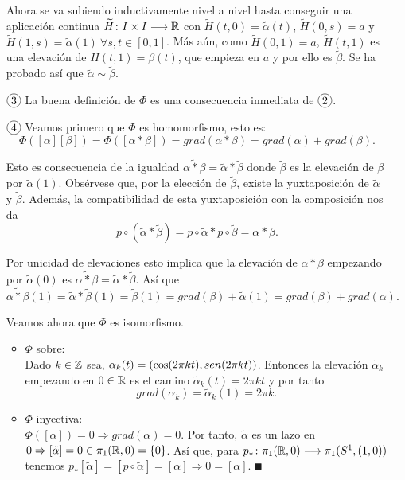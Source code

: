 \documentclass[GTS.tex]{subfiles}
\begin{document}
\begin{dem}
\begin{enumerate}
Ahora se va subiendo inductivamente nivel a nivel hasta conseguir una aplicación continua $\widetilde{H}\colon{I\times I}\longrightarrow{\mathbb{R}}$ con $\widetilde{H}(t,0)=\tilde{\alpha}(t)$, $\widetilde{H}(0,s)=a$ y $\widetilde{H}(1,s)=\tilde{\alpha}(1)\ \forall s,t\in[0,1]$. Más aún, como
$\widetilde{H}(0,1)=a$, $\widetilde{H}(t,1)$ es una elevación de $H(t,1)=\beta(t)$, que empieza en $a$ y por ello es $\tilde{\beta}$. Se ha probado así que $\tilde{\alpha}\sim\tilde{\beta}$.

\item[$\circled{3}$] La buena definición de $\Phi$ es una consecuencia inmediata de $\circled{2}$.

\item[$\circled{4}$] Veamos primero que $\Phi$ es homomorfismo, esto es:
\[
\Phi([\alpha][\beta])=\Phi([\alpha*\beta])=grad(\alpha*\beta)=grad(\alpha)+grad(\beta).
\]

Esto es consecuencia de la igualdad $\widetilde{\alpha*\beta}=\tilde{\alpha}*\tilde{\beta}$ donde $\tilde{\beta}$ es la elevación de $\beta$ por $\tilde{\alpha}(1)$. Obsérvese que, por la elección de $\tilde{\beta}$, existe la yuxtaposición de $\tilde{\alpha}$ y $\tilde{\beta}$. Además, la compatibilidad de esta yuxtaposición con la composición nos da
\[
p\circ(\tilde{\alpha}*\tilde{\beta})=p\circ\tilde{\alpha}*p\circ\tilde{\beta}=\alpha*\beta.
\]

Por unicidad de elevaciones esto implica que la elevación de $\alpha*\beta$ empezando por $\tilde{\alpha}(0)$ es $\widetilde{\alpha*\beta}=\tilde{\alpha}*\tilde{\beta}$. Así que
\[
\widetilde{\alpha*\beta}(1)=\tilde{\alpha}*\tilde{\beta}(1)=\tilde{\beta}(1)=grad(\beta)+\tilde{\alpha}(1)=grad(\beta)+grad(\alpha).
\]


Veamos ahora que $\Phi$ es isomorfismo.
\begin{itemize}
\item $\Phi$ sobre:\\
Dado $k\in\mathbb{Z}$ sea, $\alpha_k(t)=(\cos(2\pi kt),sen (2\pi kt))$. Entonces la elevación $\tilde{\alpha}_k$ empezando en $0\in\mathbb{R}$ es el camino $\tilde{\alpha}_k(t)=2\pi k t$ y por tanto
\[
grad(\alpha_k)=\tilde{\alpha}_k(1)=2\pi k.
\]

\item $\Phi$ inyectiva:\\
$\Phi([\alpha])=0\Rightarrow grad(\alpha)=0$. Por tanto, $\tilde{\alpha}$ es un lazo en $0\Rightarrow [\tilde{\alpha}]=0\in\pi_1(\mathbb{R},0)=\{0\}$. Así que, para $p_*\colon{\pi_1(\mathbb{R},0)}\longrightarrow{\pi_1(S^1,(1,0))}$ tenemos $p_*[\tilde{\alpha}]=[p\circ\tilde{\alpha}]=[\alpha]\Rightarrow 0=[\alpha]$. $\QED$
\end{itemize}
\end{enumerate}
\end{dem}
\end{document}
